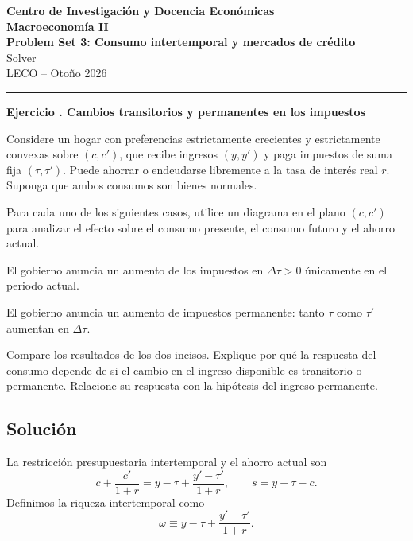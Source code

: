 \documentclass[11pt]{article}
\let\enumerateoriginal\enumerate
\let\endenumerateoriginal\endenumerate
\renewenvironment{enumerate}{%
  \enumerateoriginal
  \setlength{\itemsep}{0.5em}%
  \setlength{\parsep}{0pt}%
  \setlength{\topsep}{0.4em}%
}{\endenumerateoriginal}
\newcounter{problema}
\newenvironment{problema}[1]{%
  \par
  \refstepcounter{problema}%
  \addvspace{0.9em}%
  \noindent\textbf{Ejercicio \theproblema. #1}
  \par\nobreak\smallskip
}{\par}
\begin{document}
\begin{center}
  {\large\textbf{Centro de Investigación y Docencia Económicas}}\\[0.25em]
  {\large\textbf{Macroeconomía II}}\\[0.2em]
  {\large\textbf{Problem Set 3: Consumo intertemporal y mercados de crédito} \\
  Solver}\\[0.35em]
  LECO -- Otoño 2026
\end{center}

\vspace{0.6em}
\hrule
\vspace{0.6em}



\begin{problema}{Cambios transitorios y permanentes en los impuestos}
Considere un hogar con preferencias estrictamente crecientes y estrictamente convexas sobre $(c,c')$, que recibe ingresos $(y,y')$ y paga impuestos de suma fija $(\tau,\tau')$. Puede ahorrar o endeudarse libremente a la tasa de interés real $r$. Suponga que ambos consumos son bienes normales.

Para cada uno de los siguientes casos, utilice un diagrama en el plano $(c,c')$ para analizar el efecto sobre el consumo presente, el consumo futuro y el ahorro actual.

\begin{enumerate}
  \item El gobierno anuncia un aumento de los impuestos en $\Delta\tau>0$ únicamente en el periodo actual.

  \item El gobierno anuncia un aumento de impuestos permanente: tanto $\tau$ como $\tau'$ aumentan en $\Delta\tau$.

  \item Compare los resultados de los dos incisos. Explique por qué la respuesta del consumo depende de si el cambio en el ingreso disponible es transitorio o permanente. Relacione su respuesta con la hipótesis del ingreso permanente.
\end{enumerate}
\end{problema}




\subsection*{Solución}

La restricción presupuestaria intertemporal y el ahorro actual son
\[
  c+\frac{c'}{1+r}
  =
  y-\tau+\frac{y'-\tau'}{1+r},
  \qquad
  s=y-\tau-c.
\]
Definimos la riqueza intertemporal como
\[
\omega\equiv y-\tau+\frac{y'-\tau'}{1+r}.
\]
\end{document}
